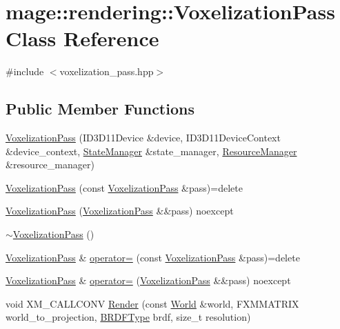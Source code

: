 \hypertarget{classmage_1_1rendering_1_1_voxelization_pass}{}\section{mage\+:\+:rendering\+:\+:Voxelization\+Pass Class Reference}
\label{classmage_1_1rendering_1_1_voxelization_pass}


{\ttfamily \#include $<$voxelization\+\_\+pass.\+hpp$>$}

\subsection*{Public Member Functions}
\begin{DoxyCompactItemize}
\item 
\hyperlink{classmage_1_1rendering_1_1_voxelization_pass_a5ffb9a465e954b6795bc49dfdd8a21d8}{Voxelization\+Pass} (I\+D3\+D11\+Device \&device, I\+D3\+D11\+Device\+Context \&device\+\_\+context, \hyperlink{classmage_1_1rendering_1_1_state_manager}{State\+Manager} \&state\+\_\+manager, \hyperlink{classmage_1_1rendering_1_1_resource_manager}{Resource\+Manager} \&resource\+\_\+manager)
\item 
\hyperlink{classmage_1_1rendering_1_1_voxelization_pass_a74f9898700c2d2877ec663fe23a85670}{Voxelization\+Pass} (const \hyperlink{classmage_1_1rendering_1_1_voxelization_pass}{Voxelization\+Pass} \&pass)=delete
\item 
\hyperlink{classmage_1_1rendering_1_1_voxelization_pass_abbdf28fc21b6b4fe4eebf8ed02ac015d}{Voxelization\+Pass} (\hyperlink{classmage_1_1rendering_1_1_voxelization_pass}{Voxelization\+Pass} \&\&pass) noexcept
\item 
\hyperlink{classmage_1_1rendering_1_1_voxelization_pass_ab989ce6ec60745d7339a1288554dd400}{$\sim$\+Voxelization\+Pass} ()
\item 
\hyperlink{classmage_1_1rendering_1_1_voxelization_pass}{Voxelization\+Pass} \& \hyperlink{classmage_1_1rendering_1_1_voxelization_pass_a30bf15dac8660764cd1342a4f397e47e}{operator=} (const \hyperlink{classmage_1_1rendering_1_1_voxelization_pass}{Voxelization\+Pass} \&pass)=delete
\item 
\hyperlink{classmage_1_1rendering_1_1_voxelization_pass}{Voxelization\+Pass} \& \hyperlink{classmage_1_1rendering_1_1_voxelization_pass_ac7beb95fbf6fd85355703854ac282e91}{operator=} (\hyperlink{classmage_1_1rendering_1_1_voxelization_pass}{Voxelization\+Pass} \&\&pass) noexcept
\item 
void X\+M\+\_\+\+C\+A\+L\+L\+C\+O\+NV \hyperlink{classmage_1_1rendering_1_1_voxelization_pass_a9c009b1df356c289b8c8419870dfc0a7}{Render} (const \hyperlink{classmage_1_1rendering_1_1_world}{World} \&world, F\+X\+M\+M\+A\+T\+R\+IX world\+\_\+to\+\_\+projection, \hyperlink{namespacemage_1_1rendering_a13c5e70586af4ce254146074ec055bf6}{B\+R\+D\+F\+Type} brdf, size\+\_\+t resolution)
\end{DoxyCompactItemize}
